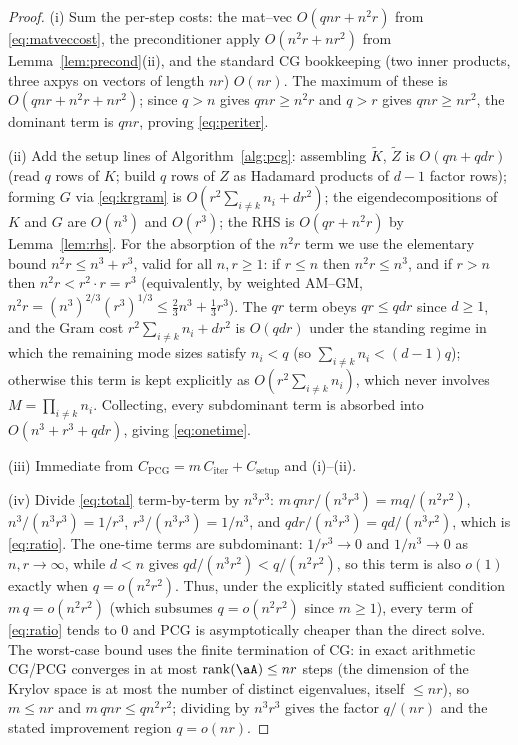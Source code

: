 \begin{proof}
(i) Sum the per-step costs: the mat--vec $O(qnr+n^{2}r)$ from
\eqref{eq:matveccost}, the preconditioner apply $O(n^{2}r+nr^{2})$ from
Lemma~\ref{lem:precond}(ii), and the standard CG bookkeeping (two inner
products, three axpys on vectors of length $nr$) $O(nr)$. The maximum of these
is $O(qnr+n^{2}r+nr^{2})$; since $q>n$ gives $qnr\ge n^{2}r$ and $q>r$ gives
$qnr\ge nr^{2}$, the dominant term is $qnr$, proving \eqref{eq:periter}.

(ii) Add the setup lines of Algorithm~\ref{alg:pcg}: assembling $\tilde K$,
$\tilde Z$ is $O(qn+qdr)$ (read $q$ rows of $K$; build $q$ rows of $Z$ as
Hadamard products of $d-1$ factor rows); forming $G$ via \eqref{eq:krgram} is
$O(r^{2}\sum_{i\neq k}n_i+dr^{2})$; the eigendecompositions of $K$ and $G$ are
$O(n^{3})$ and $O(r^{3})$; the RHS is $O(qr+n^{2}r)$ by Lemma~\ref{lem:rhs}.
For the absorption of the $n^{2}r$ term we use the elementary bound
$n^{2}r\le n^{3}+r^{3}$, valid for all $n,r\ge1$: if $r\le n$ then
$n^{2}r\le n^{3}$, and if $r>n$ then $n^{2}r<r^{2}\cdot r=r^{3}$ (equivalently, by
weighted AM--GM, $n^{2}r=(n^{3})^{2/3}(r^{3})^{1/3}\le\tfrac23 n^{3}+\tfrac13 r^{3}$).
The $qr$ term obeys $qr\le qdr$ since $d\ge1$, and the Gram cost
$r^{2}\sum_{i\neq k}n_i+dr^{2}$ is $O(qdr)$ under the standing regime in which the
remaining mode sizes satisfy $n_i<q$ (so $\sum_{i\neq k}n_i<(d-1)q$); otherwise
this term is kept explicitly as $O(r^{2}\sum_{i\neq k}n_i)$, which never involves
$M=\prod_{i\neq k}n_i$. Collecting, every subdominant term is absorbed into
$O(n^{3}+r^{3}+qdr)$, giving \eqref{eq:onetime}.

(iii) Immediate from $C_{\mathrm{PCG}}=m\,C_{\mathrm{iter}}+C_{\mathrm{setup}}$
and (i)--(ii).

(iv) Divide \eqref{eq:total} term-by-term by $n^{3}r^{3}$:
$m\,qnr/(n^{3}r^{3})=mq/(n^{2}r^{2})$, $n^{3}/(n^{3}r^{3})=1/r^{3}$,
$r^{3}/(n^{3}r^{3})=1/n^{3}$, and $qdr/(n^{3}r^{3})=qd/(n^{3}r^{2})$, which is
\eqref{eq:ratio}. The one-time terms are subdominant: $1/r^{3}\to0$ and
$1/n^{3}\to0$ as $n,r\to\infty$, while $d<n$ gives
$qd/(n^{3}r^{2})<q/(n^{2}r^{2})$, so this term is also $o(1)$ exactly when
$q=o(n^{2}r^{2})$. Thus, under the explicitly stated sufficient condition
$m\,q=o(n^{2}r^{2})$ (which subsumes $q=o(n^{2}r^{2})$ since $m\ge1$), every
term of \eqref{eq:ratio} tends to $0$ and PCG is asymptotically cheaper than the
direct solve. The worst-case bound uses the finite
termination of CG: in exact arithmetic CG/PCG converges in at most
$\operatorname{rank}(\aA)\le nr$ steps (the dimension of the Krylov space is at
most the number of distinct eigenvalues, itself $\le nr$), so $m\le nr$ and
$m\,qnr\le qn^{2}r^{2}$; dividing by $n^{3}r^{3}$ gives the factor $q/(nr)$ and
the stated improvement region $q=o(nr)$.
\end{proof}

